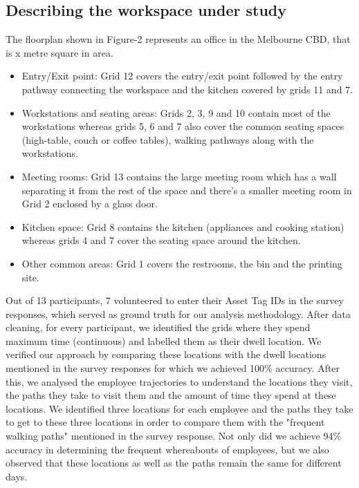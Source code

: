 \documentclass[acmtog]{acmart}
\begin{document}
\subsection{Describing the workspace under study}
The floorplan shown in Figure-2 represents an office in the Melbourne CBD, that is x metre square in area. \begin{itemize}
    \item Entry/Exit point: Grid 12 covers the entry/exit point followed by the entry pathway connecting the workspace and the kitchen covered by grids 11 and 7. 
    \item Workstations and seating areas: Grids 2, 3, 9 and 10 contain most of the workstations whereas grids 5, 6 and 7 also cover the common seating spaces (high-table, couch or coffee tables), walking pathways along with the workstations.
    \item Meeting rooms: Grid 13 contains the large meeting room which has a wall separating it from the rest of the space and there's a smaller meeting room in Grid 2 enclosed by a glass door. 
    \item Kitchen space: Grid 8 contains the kitchen (appliances and cooking station) whereas grids 4 and 7 cover the seating space around the kitchen. 
    \item Other common areas: Grid 1 covers the restrooms, the bin and the printing site. 
\end{itemize}




Out of 13 participants, 7 volunteered to enter their Asset Tag IDs in the survey responses, which served as ground truth for our analysis methodology. After data cleaning, for every participant, we identified the grids where they spend maximum time (continuous) and labelled them as their dwell location. We verified our approach by comparing these locations with the dwell locations mentioned in the survey responses for which we achieved 100\% accuracy. After this, we analysed the employee trajectories to understand the locations they visit, the paths they take to visit them and the amount of time they spend at these locations. We identified three locations for each employee and the paths they take to get to these three locations in order to compare them with the "frequent walking paths" mentioned in the survey response. Not only did we achieve 94\% accuracy in determining the frequent whereabouts of employees, but we also observed that these locations as well as the paths remain the same for different days.
\end{document}
